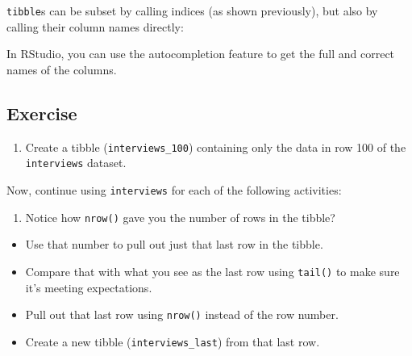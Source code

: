 \documentclass[
]{article}
\newenvironment{Shaded}{\begin{snugshade}}{\end{snugshade}}
\newcommand{\CommentTok}[1]{\textcolor[rgb]{0.56,0.35,0.01}{\textit{#1}}}
\newcommand{\NormalTok}[1]{#1}
\newcommand{\SpecialCharTok}[1]{\textcolor[rgb]{0.81,0.36,0.00}{\textbf{#1}}}
\newcommand{\StringTok}[1]{\textcolor[rgb]{0.31,0.60,0.02}{#1}}
\providecommand{\tightlist}{%
  \setlength{\itemsep}{0pt}\setlength{\parskip}{0pt}}
\begin{document}
\texttt{tibble}s can be subset by calling indices (as shown previously),
but also by calling their column names directly:

\begin{Shaded}
\end{Shaded}

In RStudio, you can use the autocompletion feature to get the full and
correct names of the columns.

\subsection{Exercise}\label{exercise}

\begin{enumerate}
\def\labelenumi{\arabic{enumi}.}
\tightlist
\item
  Create a tibble (\texttt{interviews\_100}) containing only the data in
  row 100 of the \texttt{interviews} dataset.
\end{enumerate}

Now, continue using \texttt{interviews} for each of the following
activities:

\begin{enumerate}
\def\labelenumi{\arabic{enumi}.}
\setcounter{enumi}{1}
\tightlist
\item
  Notice how \texttt{nrow()} gave you the number of rows in the tibble?
\end{enumerate}

\begin{itemize}
\tightlist
\item
  Use that number to pull out just that last row in the tibble.
\item
  Compare that with what you see as the last row using \texttt{tail()}
  to make sure it's meeting expectations.
\item
  Pull out that last row using \texttt{nrow()} instead of the row
  number.
\item
  Create a new tibble (\texttt{interviews\_last}) from that last row.
\end{itemize}
\end{document}
